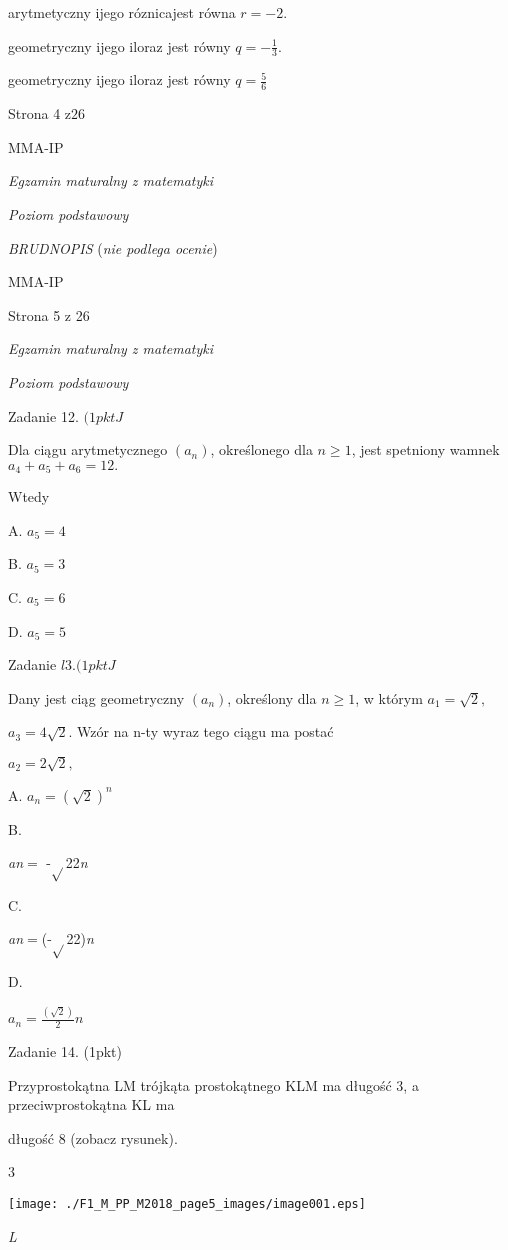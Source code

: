 \documentclass[a4paper,12pt]{article}
\begin{document}
arytmetyczny ijego róznicajest równa $r=-2.$

geometryczny ijego iloraz jest równy $q=-\displaystyle \frac{1}{3}.$

geometryczny ijego iloraz jest równy $q=\displaystyle \frac{5}{6}$

Strona 4 $\mathrm{z}26$

MMA-IP





{\it Egzamin maturalny z matematyki}

{\it Poziom podstawowy}

{\it BRUDNOPIS} ({\it nie podlega ocenie})

MMA-IP

Strona 5 z 26





{\it Egzamin maturalny z matematyki}

{\it Poziom podstawowy}

Zadanie 12. $(1pktJ$

Dla ciągu arytmetycznego $(a_{n})$, określonego dla $n\geq 1$, jest spetniony wamnek $a_{4}+a_{5}+a_{6}=12.$

Wtedy

A. $a_{5}=4$

B. $a_{5}=3$

C. $a_{5}=6$

D. $a_{5}=5$

Zadanie $l3. (1pktJ$

Dany jest ciąg geometryczny $(a_{n})$, określony dla $n\geq 1$, w którym $a_{1}=\sqrt{2},$

$a_{3}=4\sqrt{2}$. Wzór na n-ty wyraz tego ciągu ma postać

$a_{2}=2\sqrt{2},$

A. $a_{n}=(\sqrt{2})^{n}$

B.

{\it an}$=$ -$\sqrt{}$22{\it n}

C.

{\it an}$=$(-$\sqrt{}$22){\it n}

D.

$a_{n}=\displaystyle \frac{(\sqrt{2})}{2}n$

Zadanie 14. (1pkt)

Przyprostokątna LM trójkąta prostokątnego KLM ma długość 3, a przeciwprostokątna KL ma

długość 8 (zobacz rysunek).

3
\begin{center}
\texttt{[image: ./F1\_M\_PP\_M2018\_page5\_images/image001.eps]}
\end{center}
{\it L}
\end{document}
